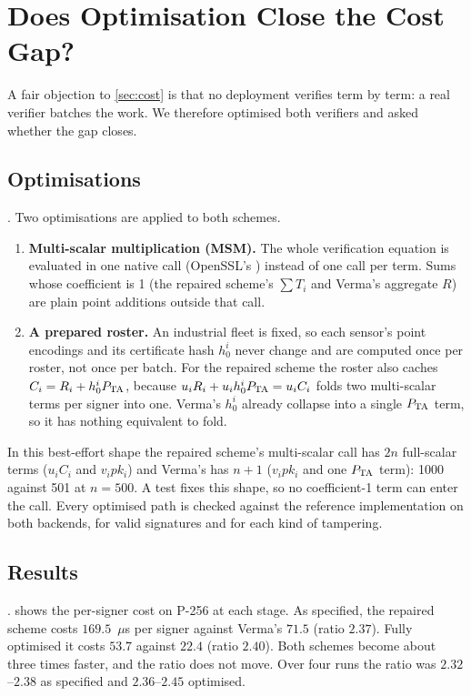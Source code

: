 \section{Does Optimisation Close the Cost Gap?}\label{sec:opt}

A fair objection to \cref{sec:cost} is that no deployment verifies term by term: a real verifier batches
the work. We therefore optimised both verifiers and asked whether the gap closes.

\subsection{Optimisations}
. Two optimisations are applied to both schemes.
\begin{enumerate}
\item \textbf{Multi-scalar multiplication (MSM).} The whole verification equation is evaluated in one
      native call (OpenSSL's ) instead of one call per term. Sums whose coefficient
      is 1 (the repaired scheme's $\sum T_i$ and Verma's aggregate $R$) are plain point additions outside
      that call.
\item \textbf{A prepared roster.} An industrial fleet is fixed, so each sensor's point encodings and its
      certificate hash $h_0^i$ never change and are computed once per roster, not once per batch. For the
      repaired scheme the roster also caches $C_i=R_i+h_0^iP_{\mathrm{TA}}$, because
      $u_iR_i+u_ih_0^iP_{\mathrm{TA}}=u_iC_i$ folds two multi-scalar terms per signer into one. Verma's $h_0^i$
      already collapse into a single $P_{\mathrm{TA}}$ term, so it has nothing equivalent to fold.
\end{enumerate}
In this best-effort shape the repaired scheme's multi-scalar call has $2n$ full-scalar terms
($u_iC_i$ and $v_ipk_i$) and Verma's has $n+1$ ($v_ipk_i$ and one $P_{\mathrm{TA}}$ term): 1000 against 501 at
$n=500$. A test fixes this shape, so no coefficient-1 term can enter the call. Every optimised path is
checked against the reference implementation on both backends, for valid signatures and for each kind of
tampering.

\subsection{Results}
.  shows the per-signer cost on P-256 at each stage. As specified, the
repaired scheme costs $169.5$~$\mu$s per signer against Verma's $71.5$ (ratio $2.37$). Fully optimised it
costs $53.7$ against $22.4$ (ratio $2.40$). Both schemes become about three times faster, and the ratio
does not move. Over four runs the ratio was $2.32$--$2.38$ as specified and $2.36$--$2.45$ optimised.

